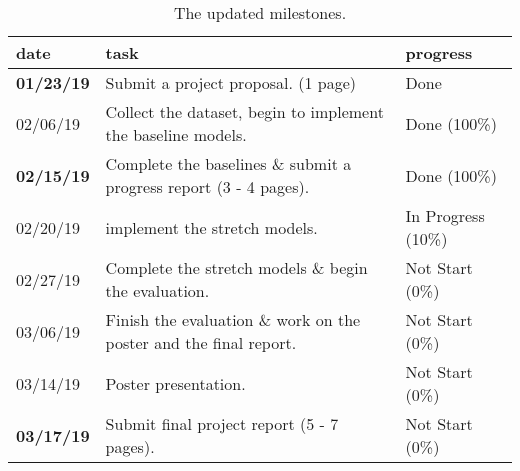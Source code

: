 \documentclass[runningheads]{llncs}
\begin{document}
\begin{table}
\centering
\begin{small}
\begin{tabular}{|l| l| l|} 
\hline
\bfseries date & \bfseries task & \bfseries progress  \\ 
\hline
\textbf{01/23/19}  
& Submit a project proposal. (1 page)    
& Done               \\ 
\hline
02/06/19 
& Collect the dataset, begin to implement the baseline models.   
&     Done (100\%)            \\ 
\hline
\textbf{02/15/19}     
&   Complete the baselines \& submit a progress report (3 - 4 pages).     
&   Done (100\%)             \\ 
\hline
02/20/19    
&    implement the stretch models.      &      In Progress (10\%)           \\ 
\hline
02/27/19 & Complete the stretch models \& begin the evaluation.    
&  Not Start (0\%)         \\ 
\hline
03/06/19 
&     Finish the evaluation \& work on the poster and the final report.
&     Not Start (0\%)           \\ 
\hline
03/14/19        
&    Poster presentation.   
&    Not Start (0\%)       \\
\hline
\textbf{03/17/19}        
&    Submit final project report (5 - 7 pages).
&    Not Start (0\%)       \\
\hline
\end{tabular}
\end{small}
\caption{The updated milestones.}\label{tab:milestones}
\end{table}

\end{document}
